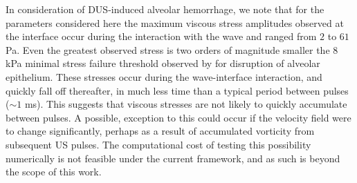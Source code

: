 In consideration of \ac{DUS}-induced alveolar hemorrhage, we note that
for the parameters considered here the maximum viscous stress
amplitudes observed at the interface occur during the interaction with
the wave and ranged from $2$ to $61$ Pa. Even
the greatest observed stress is two orders of magnitude smaller the
$8$ kPa minimal stress failure threshold observed by \cite{West1991}
for disruption of alveolar epithelium. These stresses occur during
the wave-interface interaction, and quickly fall off thereafter, in
much less time than a typical period between pulses ($\sim 1$
ms). This suggests that viscous stresses are not likely to quickly
accumulate between pulses. A possible, exception to this could occur
if the velocity field were to change significantly, perhaps as a
result of accumulated vorticity from subsequent \ac{US} pulses. The
computational cost of testing this possibility numerically is not feasible under
the current framework, and as such is beyond the scope of this work.
% 
% 
